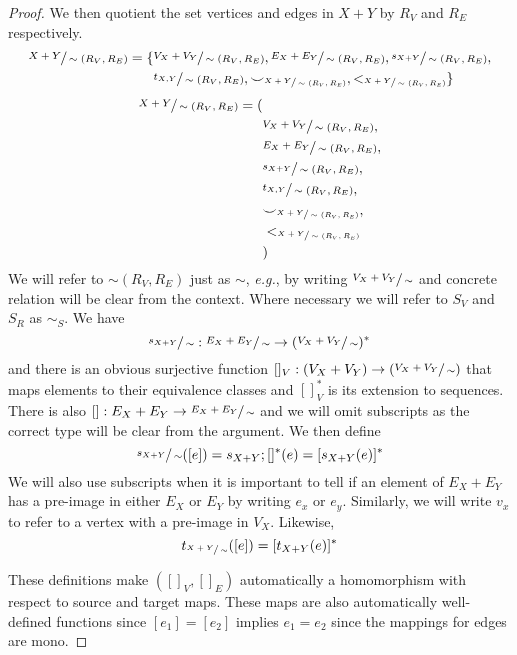 \begin{proof}
We then quotient the set vertices and edges in $X + Y$ by $R_{V}$ and $R_{E}$ respectively.
\ifdefined \ONECOLUMN
\begin{align*}
    \sfrac{X + Y}{\sim (R_{V},R_{E})} = \{
        &\sfrac{V_{X} + V_{Y}}{\sim (R_{V},R_{E})}, \sfrac{E_{X} + E_{Y}}{\sim (R_{V},R_{E})}, \sfrac{s_{X+Y}}{\sim (R_{V},R_{E})},\\
        &\sfrac{t_{X,Y}}{\sim (R_{V},R_{E})}, {\smile}_{\sfrac{X+Y}{\sim (R_{V},R_{E})}}, <_{\sfrac{X + Y}{\sim (R_{V},R_{E})}}\}    
\end{align*}
\else
    \begin{align*}
        \sfrac{X + Y}{\sim (R_{V},R_{E})} = (&\\
            &\sfrac{V_{X} + V_{Y}}{\sim (R_{V},R_{E})},\\
            &\sfrac{E_{X} + E_{Y}}{\sim (R_{V},R_{E})},\\
            &\sfrac{s_{X+Y}}{\sim (R_{V},R_{E})},\\
            &\sfrac{t_{X,Y}}{\sim (R_{V},R_{E})},\\
            &{\smile}_{\sfrac{X+Y}{\sim (R_{V},R_{E})}},\\
            &<_{\sfrac{X + Y}{\sim (R_{V},R_{E})}}\\
        &)    
    \end{align*}
\fi
We will refer to $\sim (R_{V},R_{E})$ just as $\sim$, \textit{e.g.}, by writing $\sfrac{V_{X} + V_{Y}}{\sim}$ and concrete relation will be clear from the context.
Where necessary we will refer to $S_{V}$ and $S_{R}$ as $\sim_{S}$.
We have 
\[
    \sfrac{s_{X+Y}}{\sim} : \sfrac{E_{X} + E_{Y}}{\sim} \to (\sfrac{V_{X} + V_{Y}}{\sim})^{*}
\]
and there is an obvious surjective function $[]_{V} : (V_{X} + V_{Y}) \to (\sfrac{V_{X} + V_{Y}}{\sim})$ that maps elements to their equivalence classes and $[]_{V}^{*}$ is its extension to sequences.
There is also $[] : E_{X} + E_{Y} \to \sfrac{E_{X} + E_{Y}}{\sim}$ and we will omit subscripts as the correct type will be clear from the argument.
We then define 
\[
    \sfrac{s_{X+Y}}{\sim}([e]) = s_{X+Y};[]^{*}(e) = [s_{X+Y}(e)]^{*}
\]
We will also use subscripts when it is important to tell if an element of $E_{X} + E_{Y}$ has a pre-image in either $E_{X}$ or $E_{Y}$ by writing $e_{x}$ or $e_{y}$.
Similarly, we will write $v_{x}$ to refer to a vertex with a pre-image in $V_{X}$.
Likewise, 
\[
    t_{\sfrac{X+Y}{\sim}}([e]) = [t_{X+Y}(e)]^{*}
\]

These definitions make $([]_{V},[]_{E})$ automatically a homomorphism with respect to source and target maps.
These maps are also automatically well-defined functions since $[e_1] = [e_2]$ implies $e_1 = e_2$ since the mappings for edges are mono.


\end{proof}

